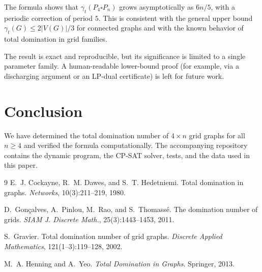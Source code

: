 \documentclass[11pt]{article}
\begin{document}
The formula shows that $\gamma_t(P_4 \square P_n)$ grows asymptotically as $6n/5$, with a
periodic correction of period $5$. This is consistent with the general upper bound
$\gamma_t(G) \le 2|V(G)|/3$ for connected graphs \cite{henning2013} and with the known
behavior of total domination in grid families.

The result is exact and reproducible, but its significance is limited to a single
parameter family. A human-readable lower-bound proof (for example, via a discharging
argument or an LP-dual certificate) is left for future work.

\section{Conclusion}

We have determined the total domination number of $4 \times n$ grid graphs for all
$n \ge 4$ and verified the formula computationally. The accompanying repository
contains the dynamic program, the CP-SAT solver, tests, and the data used in this paper.

\begin{thebibliography}{9}
E.~J. Cockayne, R.~M. Dawes, and S.~T. Hedetniemi.
Total domination in graphs.
\emph{Networks}, 10(3):211--219, 1980.

D.~Gon\c{c}alves, A.~Pinlou, M.~Rao, and S.~Thomass\'e.
The domination number of grids.
\emph{SIAM J. Discrete Math.}, 25(3):1443--1453, 2011.

S.~Gravier.
Total domination number of grid graphs.
\emph{Discrete Applied Mathematics}, 121(1--3):119--128, 2002.

M.~A. Henning and A.~Yeo.
\emph{Total Domination in Graphs}.
Springer, 2013.
\end{thebibliography}



\end{document}
